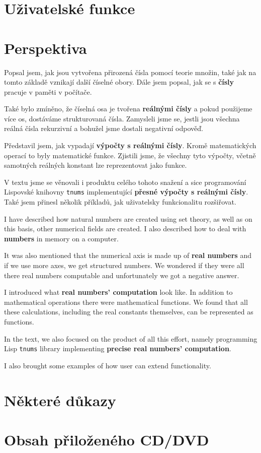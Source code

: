 \documentclass[
master=false,
field=inf,
encoding=utf8,
language=czech,
printversion=false,]{kidiplom}
\begin{document}
\section{Uživatelské funkce}

\clearpage
\section{Perspektiva}

\begin{kiconclusions}
Popsal jsem, jak jsou vytvořena přirozená čísla pomocí teorie množin, také jak na tomto základě vznikají další číselné obory. Dále jsem popsal, jak se s \textbf{čísly} pracuje v paměti v počítače.

Také bylo zmíněno, že číselná osa je tvořena \textbf{reálnými čísly} a pokud použijeme více os, dostáváme strukturovaná čísla. Zamysleli jsme se, jestli jsou všechna reálná čísla rekurzivní a bohužel jsme dostali negativní odpověď.

Představil jsem, jak vypadají \textbf{výpočty s reálnými čísly}. Kromě matematických operací to byly matematické funkce. Zjistili jsme, že všechny tyto výpočty, včetně samotných reálných konstant lze reprezentovat jako funkce.

V textu jsme se věnovali i produktu celého tohoto snažení a sice programování Lispovské knihovny \texttt{tnums} implementující \textbf{přesné výpočty s reálnými čísly}. Také jsem přinesl několik příkladů, jak uživatelsky funkcionalitu rozšiřovat.
\end{kiconclusions}
\begin{kiconclusions}[english]
I have described how natural numbers are created using set theory, as well as on this basis, other numerical fields are created. I also described how to deal with \textbf{numbers} in memory on a computer.

It was also mentioned that the numerical axis is made up of \textbf{real numbers} and if we use more axes, we get structured numbers. We wondered if they were all there real numbers computable and unfortunately we got a negative answer.

I introduced what \textbf{real numbers' computation} look like. In addition to mathematical operations there were mathematical functions. We found that all these calculations, including the real constants themselves, can be represented as functions.

In the text, we also focused on the product of all this effort, namely programming Lisp \texttt{tnums} library implementing \textbf{precise real numbers' computation}.

I also brought some examples of how user can extend functionality.
\end{kiconclusions}
\clearpage
\printbibliography[heading=bibintoc, title={Seznam literatury}]
\appendix
\section{Některé důkazy}\label{pril:dukazy}

\clearpage
\section{Obsah přiloženého CD/DVD}\label{pril:adresar}

\end{document}
